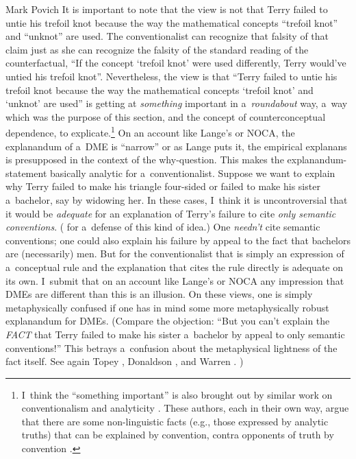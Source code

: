 \begin{artengenv}{Mark Povich}
It is important to note that the view is not that Terry failed to untie his trefoil knot because the way the mathematical concepts ``trefoil knot'' and ``unknot'' are used. The conventionalist can recognize that falsity of that claim just as she can recognize the falsity of the standard reading of the counterfactual, ``If the concept ‘trefoil knot' were used differently, Terry would've untied his trefoil knot''. Nevertheless, the view is that ``Terry failed to untie his trefoil knot because the way the mathematical concepts ‘trefoil knot' and ‘unknot' are used'' is getting at \textit{something} important in a~\textit{roundabout} way, a~way which was the purpose of this section, and the concept of counterconceptual dependence, to explicate.\footnote{I~think the ``something important'' is also brought out by similar work on conventionalism and analyticity
\parencites[e.g.,][]{topey_linguistic_2019}{warren_shadows_2020}{raven_analyticity_2021}.
 These authors, each in their own way, argue that there are some non-linguistic facts (e.g., those expressed by analytic truths) that can be explained by convention, contra opponents of truth by convention 
\parencite[e.g.,][]{boghossian_analyticity_1996}.
} On an account like Lange's or NOCA, the explanandum of a~DME is ``narrow'' or as Lange puts it, the empirical explanans is presupposed in the context of the why-question. This makes the explanandum-statement basically analytic for a~conventionalist. Suppose we want to explain why Terry failed to make his triangle four-sided or failed to make his sister a~bachelor, say by widowing her. In these cases, I~think it is uncontroversial that it would be \textit{adequate} for an explanation of Terry's failure to cite \textit{only semantic conventions}.
(\cite[See][]{raven_analyticity_2021} for a~defense of this kind of idea.) %
 One \textit{needn't} cite semantic conventions; one could also explain his failure by appeal to the fact that bachelors are (necessarily) men. But for the conventionalist that is simply an expression of a~conceptual rule and the explanation that cites the rule directly is adequate on its own. I~submit that on an account like Lange's or NOCA any impression that DMEs are different than this is an illusion. On these views, one is simply metaphysically confused if one has in mind some more metaphysically robust explanandum for DMEs. (Compare the objection: ``But you can't explain the \textit{FACT} that Terry failed to make his sister a~bachelor by appeal to only semantic conventions!'' This betrays a~confusion about the metaphysical lightness of the fact itself. See again Topey 
\parencite*[][]{topey_linguistic_2019}, %
 Donaldson 
\parencite*[][]{raven_analyticity_2021}, %
 and Warren 
\parencite*[][]{warren_shadows_2020}.%
)


\end{artengenv}
